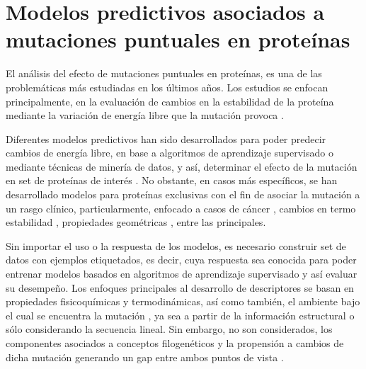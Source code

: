 
\chapter{Modelos predictivos asociados a mutaciones puntuales en proteínas}

\ifpdf
    \graphicspath{{Chapter2/Figs/Raster/}{Chapter2/Figs/PDF/}{Chapter2/Figs/}}
\else
    \graphicspath{{Chapter2/Figs/Vector/}{Chapter2/Figs/}}
\fi

El análisis del efecto de mutaciones puntuales en proteínas, es una de las problemáticas más estudiadas en los últimos años. Los estudios se enfocan principalmente, en la evaluación de cambios en la estabilidad de la proteína mediante la variación de energía libre que la mutación provoca \cite{Schymkowitz2005,Pandurangan2017,rohl2004protein,Parthiban2006}. 

Diferentes modelos predictivos han sido desarrollados para poder predecir cambios de energía libre, en base a algoritmos de aprendizaje supervisado o mediante técnicas de minería de datos, y así, determinar el efecto de la mutación en set de proteínas de interés \cite{Quan2016,Capriotti2008,Broom2017,Khan2010,vaisman,Getov2016,Capriotti2005}. No obstante, en casos más específicos, se han desarrollado modelos para proteínas exclusivas con el fin de asociar la mutación a un rasgo clínico, particularmente, enfocado a casos de cáncer \cite{article, Forbes2010}, cambios en termo estabilidad \cite{Tian2010}, propiedades geométricas \cite{Barenboim2008}, entre las principales.

Sin importar el uso o la respuesta de los modelos, es necesario construir set de datos con ejemplos etiquetados, es decir, cuya respuesta sea conocida para poder entrenar modelos basados en algoritmos de aprendizaje supervisado y así evaluar su desempeño. Los enfoques principales al desarrollo de descriptores se basan en propiedades fisicoquímicas y termodinámicas, así como también, el ambiente bajo el cual se encuentra la mutación \cite{Capriotti2005}, ya sea a partir de la información estructural o sólo considerando la secuencia lineal. Sin embargo, no son considerados, los componentes asociados a conceptos filogenéticos y la propensión a cambios de dicha mutación generando un gap entre ambos puntos de vista \cite{Olivera-Nappa2011}.

